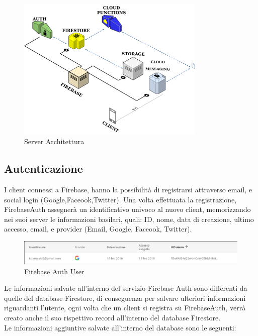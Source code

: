 \begin{figure}[!hb]
  \centering
  \includegraphics[width=0.8\textwidth]{immagini/server_arch.png}
  \caption{Server Architettura}\label{fig:Architettura Server}
\end{figure}

\subsection{Autenticazione}
I client connessi a Firebase, hanno la possibilità di registrarsi attraverso email, e social login (Google,Faceook,Twitter). Una volta effettuata la registrazione, FirebaseAuth assegnerà un identificativo univoco al nuovo client, memorizzando nei suoi server le informazioni basilari, quali: ID, nome, data di creazione, ultimo accesso, email, e provider (Email, Google, Faceook, Twitter).
\begin{figure}[!h]
  \centering
  \includegraphics[width=1\textwidth]{immagini/firebase_auth_user.png}
  \caption{Firebase Auth User}\label{fig:Firebase User}
\end{figure}

Le informazioni salvate all'interno del servizio Firebase Auth sono differenti da quelle del database Firestore, di conseguenza per salvare ulteriori informazioni riguardanti l'utente, ogni volta che un client si registra su FirebaseAuth, verrà creato anche il suo rispettivo record all'interno del database Firestore.\\
Le informazioni aggiuntive salvate all'interno del database sono le seguenti:

